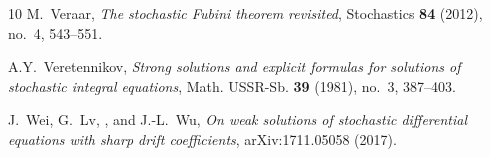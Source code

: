 \documentclass[a4paper,10pt]{article}
\newcommand\1{\mathbbm{1}}
\numberwithin{equation}{section}
\begin{document}
\begin{thebibliography}{10}
M.~Veraar, \emph{The stochastic {F}ubini theorem revisited}, Stochastics
  \textbf{{\bf84}} (2012), no.~4, 543--551.

A.Y.~Veretennikov, \emph{Strong solutions and explicit formulas for solutions of stochastic integral equations}, Math. USSR-Sb. \textbf{39} (1981), no.~3, 387--403.

J.~Wei, G.~Lv, , and J.-L.~Wu, \emph{On weak solutions of stochastic
  differential equations with sharp drift coefficients}, arXiv:1711.05058
  (2017). 

\end{thebibliography}
\end{document}

